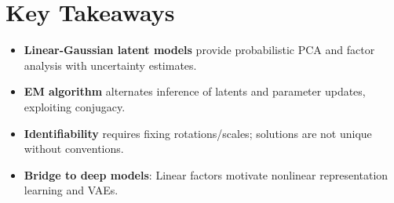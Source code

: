
\section*{Key Takeaways}

\begin{itemize}[leftmargin=2em]
    \item \textbf{Linear-Gaussian latent models} provide probabilistic PCA and factor analysis with uncertainty estimates.
    \item \textbf{EM algorithm} alternates inference of latents and parameter updates, exploiting conjugacy.
    \item \textbf{Identifiability} requires fixing rotations/scales; solutions are not unique without conventions.
    \item \textbf{Bridge to deep models}: Linear factors motivate nonlinear representation learning and VAEs.
\end{itemize}


